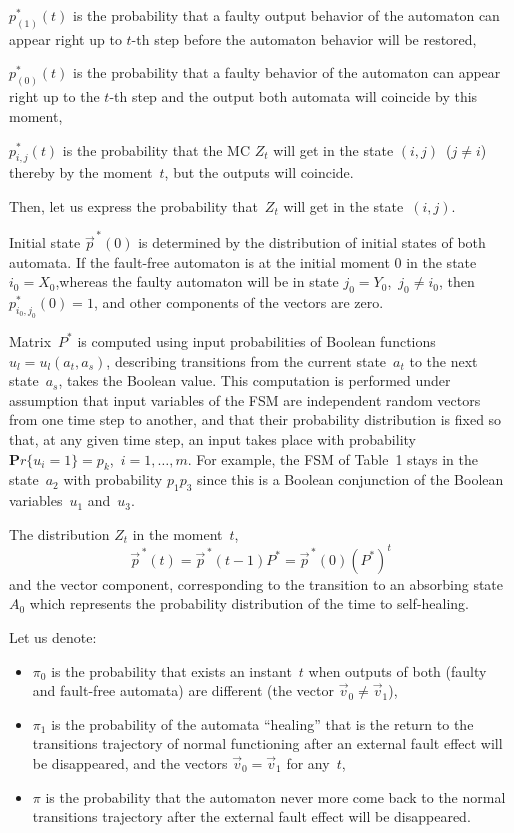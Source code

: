 \begin{multicols}{2}
$p^*_{(1)}(t)$ is the probability that a faulty output behavior
of the automaton can appear right up to $t$-th step before the
automaton behavior will be restored,

$p^*_{(0)}(t)$ is the probability that a faulty behavior of the
automaton can appear right up to the $t$-th step and the output
both automata will coincide by this moment,

$p^*_{i,j}(t)$ is the probability that the MC $Z_t$ will get
in the state $(i,j)$\  ($j \ne i$) thereby by the moment~$t$, but the outputs will coincide.

Then, let us express the probability that~$Z_t$ will get
in the state~$(i,j)$.

Initial state $\vec p^{\,*}(0)$ is determined by the distribution
of initial states of both automata.
If the fault-free automaton is at the initial moment 0 in the
state $i_0=X_0$,whereas the faulty automaton will be in state
$j_0=Y_0$,\  $j_0 \ne i_0$, then $p^*_{i_0,j_0}(0) = 1$,
and other components of the vectors are zero.

Matrix~$P^*$ is computed using input probabilities of Boolean
functions $u_l=u_l(a_t,a_s)$, describing  transitions from
the current state~$a_t$ to the next state~$a_s$, takes the
Boolean value.
This computation  is performed under assumption that input
variables of the FSM are independent random vectors from one
time step to another, and that their probability distribution
is fixed so that, at any given time step, an input takes
place with probability ${\mathbf Pr}\{u_i=1\}=p_k$,\  $i=1,\ldots,m$.
For example, the FSM of Table~1 stays in the state~$a_2$ with
probability $p_1 p_3$ since this is a Boolean
conjunction of the Boolean variables~$u_1$ and~$u_3$.

The distribution $Z_t$ in the moment~$t$,
\begin{equation}
\vec p^{\,*}(t)
=
\vec p^{\,*}(t-1) P^* = \vec p^{\,*}(0)(P^*)^t             \label{e2fr}
\end{equation}
and the vector component, corresponding to the transition
to an absorbing state~$A_0$ which represents the probability
distribution of the time to self-healing.

Let us denote:
\begin{itemize}
\item $\pi_0$ is the probability that exists an instant~$t$ when
outputs of both (faulty and fault-free automata) are
different (the vector $\vec v_0 \ne \vec v_1$),
\item
$\pi_1$ is the probability of the automata ``healing''
that is the return to the transitions trajectory of
normal functioning after an external fault effect will
be disappeared, and the vectors $\vec v_0=\vec v_1$ for any~$t$,
\item
$\pi$ is the probability that the automaton never more
come back to the normal transitions trajectory after
the external fault effect will be disappeared.
\end{itemize}


\end{multicols}
